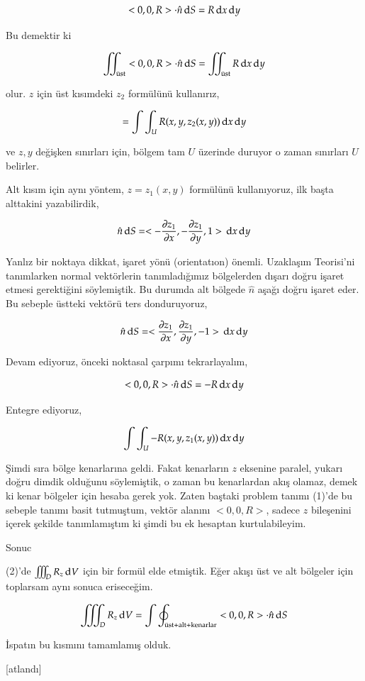 \documentclass[12pt,fleqn]{article}\usepackage{../../common}
\begin{document}
$$
< 0,0,R > \cdot \hat{n} \,\mathrm{d} S = R \,\mathrm{d} x \,\mathrm{d} y
$$

Bu demektir ki 

$$
\iint_{\textrm{üst}} < 0,0,R > \cdot \hat{n} \,\mathrm{d} S =
\iint_{\textrm{üst}} R \,\mathrm{d} x \,\mathrm{d} y
$$

olur. $z$ için üst kısımdeki $z_2$ formülünü kullanırız,

$$
= \int \int_U R(x,y,z_2(x,y)) \,\mathrm{d} x \,\mathrm{d} y
$$

ve $z,y$ değişken sınırları için, bölgem tam $U$ üzerinde duruyor o zaman
sınırları $U$ belirler.

Alt kısım için aynı yöntem, $z = z_1(x,y)$ formülünü kullanıyoruz, ilk başta
alttakini yazabilirdik,

$$
\hat{n} \,\mathrm{d} S =
< -\frac{\partial z_1}{\partial x},
-\frac{\partial z_1}{\partial y},
1 >
\,\mathrm{d} x \,\mathrm{d} y
$$

Yanlız bir noktaya dikkat, işaret yönü (orientatıon) önemli. Uzaklaşım
Teorisi'ni tanımlarken normal vektörlerin tanımladığımız bölgelerden dışarı
doğru işaret etmesi gerektiğini söylemiştik. Bu durumda alt bölgede $\hat{n}$
aşağı doğru işaret eder. Bu sebeple üstteki vektörü ters donduruyoruz,

$$
\hat{n} \,\mathrm{d} S =
<\frac{\partial z_1}{\partial x},
\frac{\partial z_1}{\partial y},
-1 >
\,\mathrm{d} x \,\mathrm{d} y
$$

Devam ediyoruz, önceki noktasal çarpımı tekrarlayalım,

$$
< 0,0,R > \cdot \hat{n} \,\mathrm{d} S = -R \,\mathrm{d} x \,\mathrm{d} y
$$

Entegre ediyoruz,

$$
\int \int_U -R (x,y,z_1(x,y)) \,\mathrm{d} x \,\mathrm{d} y
$$

Şimdi sıra bölge kenarlarına geldi. Fakat kenarların $z$ eksenine paralel,
yukarı doğru dimdik olduğunu söylemiştik, o zaman bu kenarlardan akış olamaz,
demek ki kenar bölgeler için hesaba gerek yok. Zaten baştaki problem tanımı
(1)'de bu sebeple tanımı basit tutmuştum, vektör alanını $< 0,0,R > $,
sadece $z$ bileşenini içerek şekilde tanımlamıştım ki şimdi bu ek hesaptan
kurtulabileyim.

Sonuc

(2)'de $\iiint_D R_z \,\mathrm{d} V$ için bir formül elde etmiştik. Eğer akışı üst
ve alt bölgeler için toplarsam aynı sonuca eriseceğim.

$$
\iiint_D R_z \,\mathrm{d} V = \int \oint_{\textrm{üst+alt+kenarlar}} < 0,0,R >
\cdot \hat{n} \,\mathrm{d} S
$$

İspatın bu kısmını tamamlamış olduk.

[atlandı]
\end{document}
